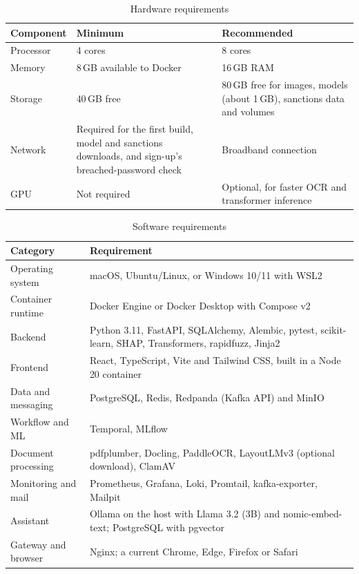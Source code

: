 \begin{table}[H]
\centering\tablestyle
\caption{Hardware requirements}\label{tab:hw}
\begin{tabularx}{\textwidth}{|L{0.16\textwidth}|L{0.34\textwidth}|Y|}
\hline
\textbf{Component} & \textbf{Minimum} & \textbf{Recommended} \\ \hline
Processor & 4 cores & 8 cores \\ \hline
Memory & 8\,GB available to Docker & 16\,GB RAM \\ \hline
Storage & 40\,GB free & 80\,GB free for images, models (about 1\,GB), sanctions data and volumes \\ \hline
Network & Required for the first build, model and sanctions downloads, and sign-up's breached-password check & Broadband connection \\ \hline
GPU & Not required & Optional, for faster OCR and transformer inference \\ \hline
\end{tabularx}
\end{table}

\begin{table}[H]
\centering\tablestyle
\caption{Software requirements}\label{tab:sw}
\begin{tabularx}{\textwidth}{|L{0.20\textwidth}|Y|}
\hline
\textbf{Category} & \textbf{Requirement} \\ \hline
Operating system & macOS, Ubuntu/Linux, or Windows 10/11 with WSL2 \\ \hline
Container runtime & Docker Engine or Docker Desktop with Compose v2 \\ \hline
Backend & Python 3.11, FastAPI, SQLAlchemy, Alembic, pytest, scikit-learn, SHAP, Transformers, rapidfuzz, Jinja2 \\ \hline
Frontend & React, TypeScript, Vite and Tailwind CSS, built in a Node 20 container \\ \hline
Data and messaging & PostgreSQL, Redis, Redpanda (Kafka API) and MinIO \\ \hline
Workflow and ML & Temporal, MLflow \\ \hline
Document processing & pdfplumber, Docling, PaddleOCR, LayoutLMv3 (optional download), ClamAV \\ \hline
Monitoring and mail & Prometheus, Grafana, Loki, Promtail, kafka-exporter, Mailpit \\ \hline
Assistant & Ollama on the host with Llama 3.2 (3B) and nomic-embed-text; PostgreSQL with pgvector \\ \hline
Gateway and browser & Nginx; a current Chrome, Edge, Firefox or Safari \\ \hline
\end{tabularx}
\end{table}

